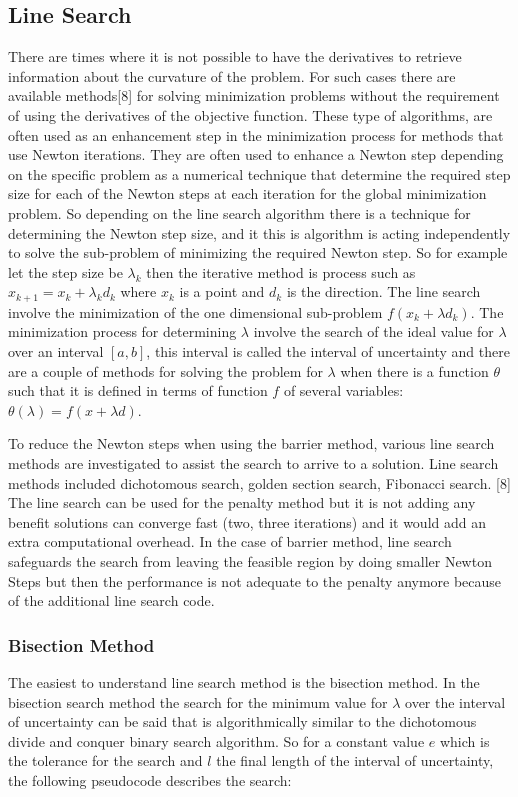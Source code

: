 \documentclass[times,12pt]{ACME2015article}
\begin{document}
\subsection{Line Search}
There are times where it is not possible to have the derivatives to retrieve information about the curvature of the problem. For such cases there are available methods[8] for solving minimization problems without the requirement of using the derivatives of the objective function.
These type of algorithms, are often used as an enhancement step in the minimization process for methods that use Newton iterations. They are often used to enhance a Newton step depending on the specific problem as a numerical technique that determine the required step size for each of the Newton steps at each iteration for the global minimization problem. So depending on the line search algorithm there is a technique for determining the Newton step size, and it this is algorithm is acting independently to solve the sub-problem of minimizing the required Newton step. So for example let the step size be $\lambda_{k}$ then the iterative method is process such as $x_{k+1} = x_{k} + \lambda_{k} d_{k}$ where $x_{k}$ is a point and $d_{k}$ is the direction. The line search involve the minimization of the one dimensional sub-problem $f(x_{k} + \lambda d_{k})$. The minimization process for determining $\lambda$ involve the search of the ideal value for $\lambda$ over an interval $[a,b]$, this interval is called the interval of uncertainty and there are a couple of methods for solving the problem for $\lambda$ when there is a function $\theta$ such that it is defined in terms of function $f$ of several variables: $\theta(\lambda) = f(x + \lambda d)$.

To reduce the Newton steps when using the barrier method, various line search methods are investigated to assist the search to arrive to a solution. Line search methods included dichotomous search, golden section search, Fibonacci search. [8] The line search can be used for the penalty method but it is not adding any benefit solutions can converge fast (two, three iterations) and it would add an extra computational overhead. 
In the case of barrier method, line search safeguards the search from leaving the feasible region by doing smaller Newton Steps but then the performance is not adequate to the penalty anymore because of the additional line search code.

\subsubsection{Bisection Method}
The easiest to understand line search method is the bisection method. In the bisection search method the search for the minimum value for $\lambda$ over the interval of uncertainty can be said that is algorithmically similar to the dichotomous divide and conquer binary search algorithm. So for a constant value $e$ which is the tolerance for the search and $l$ the final length of the interval of uncertainty, the following pseudocode describes the search:  
\end{document}
